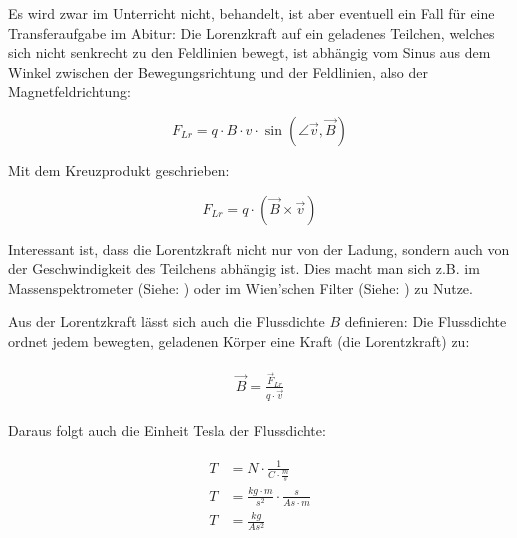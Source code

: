 \begin{NiceToKnow}
	Es wird zwar im Unterricht nicht, behandelt, ist aber eventuell ein Fall für eine Transferaufgabe im Abitur: Die Lorenzkraft auf ein geladenes Teilchen, welches sich nicht senkrecht zu den Feldlinien bewegt, ist abhängig vom Sinus aus dem Winkel zwischen der Bewegungsrichtung und der Feldlinien, also der Magnetfeldrichtung:

	\begin{equation}
		F_{Lr} = q \cdot B \cdot v \cdot \sin{(\angle{\vec{v}, \vec{B}})}
	\end{equation}

	\noindent Mit dem Kreuzprodukt geschrieben:

	\begin{equation}
		F_{Lr} = q \cdot (\vec{B} \times \vec{v})
	\end{equation}
\end{NiceToKnow}

\noindent Interessant ist, dass die Lorentzkraft nicht nur von der Ladung, sondern auch von der Geschwindigkeit des Teilchens abhängig ist. Dies macht man sich z.B. im Massenspektrometer (Siehe: ) oder im Wien'schen Filter (Siehe: ) zu Nutze.

Aus der Lorentzkraft lässt sich auch die Flussdichte $B$ definieren: Die Flussdichte ordnet jedem bewegten, geladenen Körper eine Kraft (die Lorentzkraft) zu:

\begin{align} \label{eq:Flussdichte}
\begin{split}
	\vec{B} = \frac{\vec{F}_{Lr}}{q \cdot \vec{v}}
\end{split}
\end{align}

\noindent Daraus folgt auch die Einheit Tesla der Flussdichte:

\begin{align} \label{eq:Flussdichte}
\begin{split}
	T &= N \cdot \frac{1}{C \cdot \frac{m}{s}} \\
	T &= \frac{kg \cdot m}{s^2} \cdot \frac{s}{As \cdot m} \\
	T &= \frac{kg}{As^2}	
\end{split}
\end{align}





